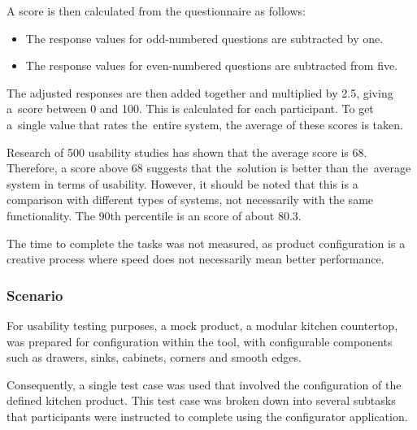 A score is then calculated from the  questionnaire as follows:
\begin{itemize}[label=\rectanglebullet]
    \item The response values for odd-numbered questions are subtracted by one.
    \item The response values for even-numbered questions are subtracted from five.
\end{itemize}
The adjusted responses are then added together and multiplied by 2.5, giving a~score between 0 and 100. This is calculated for each participant. To get a~single value that rates the~entire system, the average of these scores is taken.~\cite{Sauro2011}

Research of 500 usability studies has shown that the average  score is 68. Therefore, a score above 68 suggests that the~solution is better than the~average system in terms of usability. However, it should be noted that this is a comparison with different types of systems, not necessarily with the same functionality. The 90th percentile is an  score of about 80.3. \cite{Sauro2011}

The time to complete the tasks was not measured, as product configuration is a creative process where speed does not necessarily mean better performance. 


\subsubsection{Scenario}

For usability testing purposes, a mock product, a modular kitchen countertop, was prepared for configuration within the tool, with configurable components such as drawers, sinks, cabinets, corners and smooth edges.

Consequently, a single test case was used that involved the configuration of the defined kitchen product. This test case was broken down into several subtasks that participants were instructed to complete using the configurator application.

